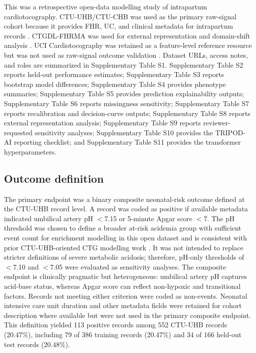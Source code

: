 \documentclass[utf8]{FrontiersinHarvard}
\begin{document}
This was a retrospective open-data modelling study of intrapartum cardiotocography. CTU-UHB/CTU-CHB was used as the primary raw-signal cohort because it provides FHR, UC, and clinical metadata for intrapartum records \citep{goldberger2000,chudacek2014,ctuuhb}. CTGDL-FHRMA was used for external representation and domain-shift analysis \citep{ctgdl}. UCI Cardiotocography was retained as a feature-level reference resource but was not used as raw-signal outcome validation \citep{uci}. Dataset URLs, access notes, and roles are summarized in Supplementary Table S1. Supplementary Table S2 reports held-out performance estimates; Supplementary Table S3 reports bootstrap model differences; Supplementary Table S4 provides phenotype summaries; Supplementary Table S5 provides prediction explainability outputs; Supplementary Table S6 reports missingness sensitivity; Supplementary Table S7 reports recalibration and decision-curve outputs; Supplementary Table S8 reports external representation analysis; Supplementary Table S9 reports reviewer-requested sensitivity analyses; Supplementary Table S10 provides the TRIPOD-AI reporting checklist; and Supplementary Table S11 provides the transformer hyperparameters.

\subsection{Outcome definition}

The primary endpoint was a binary composite neonatal-risk outcome defined at the CTU-UHB record level. A record was coded as positive if available metadata indicated umbilical artery pH $<$7.15 or 5-minute Apgar score $<$7. The pH threshold was chosen to define a broader at-risk acidemia group with sufficient event count for enrichment modelling in this open dataset and is consistent with prior CTU-UHB-oriented CTG modelling work \citep{chudacek2014,deepctg2023}. It was not intended to replace stricter definitions of severe metabolic acidosis; therefore, pH-only thresholds of $<$7.10 and $<$7.05 were evaluated as sensitivity analyses. The composite endpoint is clinically pragmatic but heterogeneous: umbilical artery pH captures acid-base status, whereas Apgar score can reflect non-hypoxic and transitional factors. Records not meeting either criterion were coded as non-events. Neonatal intensive care unit duration and other metadata fields were retained for cohort description where available but were not used in the primary composite endpoint. This definition yielded 113 positive records among 552 CTU-UHB records (20.47\%), including 79 of 386 training records (20.47\%) and 34 of 166 held-out test records (20.48\%).
\end{document}
